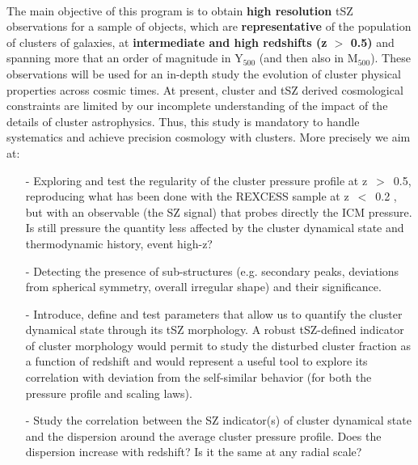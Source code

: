 \documentclass[11pt,a4paper,twoside,graphicx,color]{article}
\begin{document}
\vspace{0.3cm}  
\\
The main objective of this program is to obtain {\bf high resolution} tSZ observations for a sample of objects, which are {\bf representative} of the population of clusters of galaxies, at {\bf intermediate and high redshifts (z $>$ 0.5)} and spanning more that an order of magnitude in Y$_{500}$ (and then also in M$_{500}$). These observations will be used for an in-depth study the evolution of cluster physical properties across cosmic times. At present, cluster and tSZ derived cosmological constraints are limited by our incomplete understanding of the impact of the details of cluster astrophysics. Thus, this study is mandatory to handle systematics and achieve precision cosmology with clusters. 
%
More precisely we aim at:
\begin{itemize}
	\item [-] Exploring and test the regularity of the cluster pressure profile at z~$>$~0.5, reproducing what has been done with the REXCESS sample at z~$<$~0.2 \citep{Arnaud2010}, but with an observable (the SZ signal) that probes directly the ICM pressure. Is still pressure the quantity less affected by the cluster dynamical state and thermodynamic history, event high-z? 
	\item [-] Detecting the presence of sub-structures (e.g. secondary peaks, deviations from spherical symmetry, overall irregular shape) and their significance. 
	\item [-] Introduce, define and test parameters that allow us to quantify the cluster dynamical state through its tSZ morphology. A robust tSZ-defined indicator of cluster morphology would permit to study the disturbed cluster fraction as a function of redshift and would represent a useful tool to explore its correlation with deviation from the self-similar behavior (for both the pressure profile and scaling laws).
	\item [-] Study the correlation between the SZ indicator(s) of cluster dynamical state and the dispersion around the average cluster pressure profile. Does the dispersion increase with redshift? Is it the same at any radial scale?
\end{itemize} 
\end{document}

